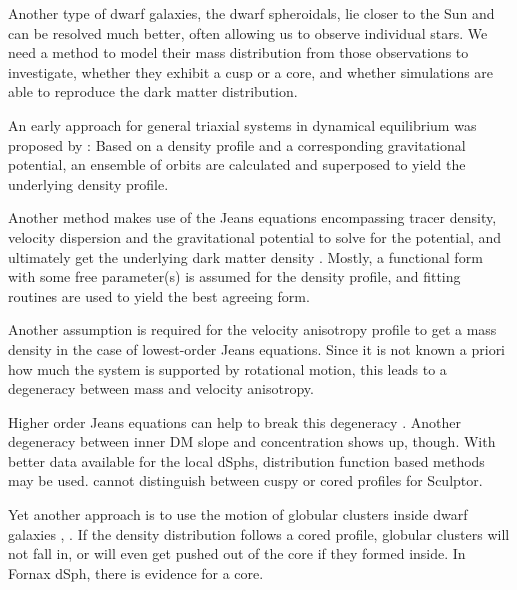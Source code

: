 
Another type of dwarf galaxies, the dwarf spheroidals, lie closer to
the Sun and can be resolved much better, often allowing us to observe
individual stars. We need a method to model their mass distribution
from those observations to investigate, whether they exhibit a cusp or
a core, and whether simulations are able to reproduce the dark matter
distribution.



An early approach for general triaxial systems in dynamical
equilibrium was proposed by \citet{Schwarzschild1979}: Based on a
density profile and a corresponding gravitational potential, an
ensemble of orbits are calculated and superposed to yield the
underlying density profile.

Another method makes use of the Jeans equations encompassing tracer
density, velocity dispersion and the gravitational potential to solve
for the potential, and ultimately get the underlying dark matter
density . Mostly, a functional form with
some free parameter(s) is assumed for the density profile, and fitting
routines are used to yield the best agreeing form.


Another assumption is required for the velocity anisotropy profile to
get a mass density in the case of lowest-order Jeans equations. Since
it is not known a priori how much the system is supported by
rotational motion, this leads to a degeneracy between mass and
velocity anisotropy.


Higher order Jeans equations can help to break this degeneracy
. Another degeneracy between inner DM slope and
concentration shows up, though. With better data available for the
local dSphs, distribution function based methods may be used.
\citet{Breddels+2012} cannot distinguish between cuspy or cored
profiles for Sculptor.



Yet another approach is to use the motion of globular clusters inside
dwarf galaxies , . If the density
distribution follows a cored profile, globular clusters will not fall
in, or will even get pushed out of the core if they formed inside. In
Fornax dSph, there is evidence for a core.


